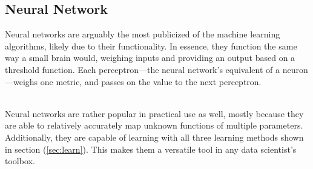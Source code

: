 \documentclass{comjnl}
\numberwithin{equation}{subsection}
\begin{document}
        \subsection{Neural Network}\label{subsec:nnet}

            Neural networks are arguably the most publicized of the machine learning algorithms,
            likely due to their functionality. In essence, they function the same way a small brain
            would, weighing inputs and providing an output based on a threshold function. Each
            perceptron---the neural network's equivalent of a neuron---weighs one metric, and
            passes on the value to the next perceptron.
            \\[0.5cm]
            \\[0.5cm]
            Neural networks are rather popular in practical use as well, mostly because they
            are able to relatively accurately map unknown functions of multiple parameters.
            Additionally, they are capable of learning with all three learning methods shown in
            section (\ref{sec:learn}). This makes them a versatile tool in any data scientist's
            toolbox.
\end{document}
